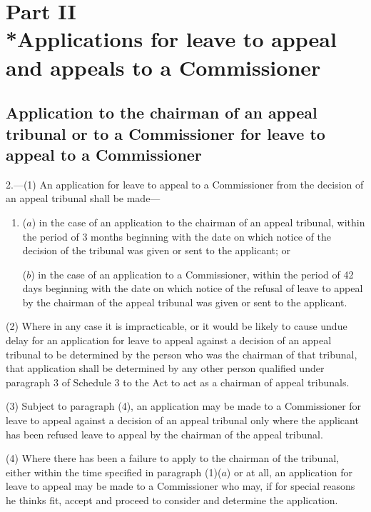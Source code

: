 \documentclass[a4paper]{article}
\newcommand{\parthead}{}
\begin{document}
\section[Part II --- Applications for leave to appeal and appeals to a Commissioner]{\sloppy Part II\\*Applications for leave to appeal and appeals to a Commissioner}

\renewcommand\parthead{--- Part II}

\subsection[2. Application to the chairman of an appeal tribunal or to a Commissioner for leave to appeal to a Commissioner]{Application to the chairman of an appeal tribunal or to a Commissioner for leave to appeal to a Commissioner}

2.—(1) An application for leave to appeal to a Commissioner from the decision of an appeal tribunal shall be made—
\begin{enumerate}\item[]
($a$) in the case of an application to the chairman of an appeal tribunal, within the period of 3 months beginning with the date on which notice of the decision of the tribunal was given or sent to the applicant; or

($b$) in the case of an application to a Commissioner, within the period of 42 days beginning with the date on which notice of the refusal of leave to appeal by the chairman of the appeal tribunal was given or sent to the applicant.
\end{enumerate}

(2) Where in any case it is impracticable, or it would be likely to cause undue delay for an application for leave to appeal against a decision of an appeal tribunal to be determined by the person who was the chairman of that tribunal, that application shall be determined by any other person qualified under paragraph 3 of Schedule 3 to the Act to act as a chairman of appeal tribunals.

(3) Subject to paragraph (4), an application may be made to a Commissioner for leave to appeal against a decision of an appeal tribunal only where the applicant has been refused leave to appeal by the chairman of the appeal tribunal.

(4) Where there has been a failure to apply to the chairman of the tribunal, either within the time specified in paragraph (1)($a$) or at all, an application for leave to appeal may be made to a Commissioner who may, if for special reasons he thinks fit, accept and proceed to consider and determine the application.
\end{document}
